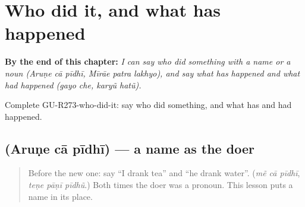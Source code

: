 
\chapter{Who did it, and what has happened}
\label{ch:gu-who-did-it-and-what-has-happened}

\begin{chapteropening}
\textbf{By the end of this chapter:} \emph{I can say who did something with a name or a noun (Aruṇe cā pīdhī, Mīrāe patra lakhyo), and say what has happened and what had happened (gayo che, karyũ hatũ).}

Complete GU-R273-who-did-it: say who did something, and what has and had happened.
\end{chapteropening}

\section[\texorpdfstring{\gu{અરુણે} \gu{ચા} \gu{પીધી} (Aruṇe cā pīdhī)}{અરુણે ચા પીધી (Aruṇe cā pīdhī)}]{   (Aruṇe cā pīdhī) — a name as the doer}

\label{lesson:GU-C273-arune-pidhi}



\begin{quote}
Before the new one: say \textquotedblleft{}I drank tea\textquotedblright{} and \textquotedblleft{}he drank water\textquotedblright{}. (\emph{mẽ cā pīdhī}, \emph{teṇe pāṇī pīdhũ}.) Both times the doer was a pronoun. This lesson puts a name in its place.
\end{quote}

